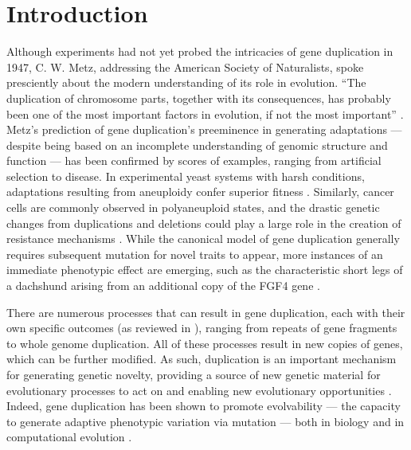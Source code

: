\section{Introduction} \label{sec:introduction}

Although experiments had not yet probed the intricacies of gene duplication in 1947, C. W. Metz, addressing the American Society of Naturalists, spoke presciently about the modern understanding of its role in evolution.
``The duplication of chromosome parts, together with its consequences, has probably been one of the most important factors in evolution, if not the most important'' \citep{Metz:chromosomeDuplication1947}.
Metz's prediction of gene duplication's preeminence in generating adaptations --- despite being based on an incomplete understanding of genomic structure and function --- has been confirmed by scores of examples, ranging from artificial selection to disease.
In experimental yeast systems with harsh conditions, adaptations resulting from aneuploidy confer superior fitness \citep{Pavelka:2010}.
Similarly, cancer cells are commonly observed in polyaneuploid states, and the drastic genetic changes from duplications and deletions could play a large role in the creation of resistance mechanisms \citep{polyaneuploidCancer}.
While the canonical model of gene duplication generally requires subsequent mutation for novel traits to appear, more instances of an immediate phenotypic effect are emerging, such as the characteristic short legs of a dachshund arising from an additional copy of the FGF4 gene \citep{ohno1970evolution,dachshundGeneCopyNum}.

There are numerous processes that can result in gene duplication, each with their own specific outcomes (as reviewed in \citep{Zhang:2003fw}), ranging from repeats of gene fragments to whole genome duplication.
All of these processes result in new copies of genes, which can be further modified.
As such, duplication is an important mechanism for generating genetic novelty, providing a source of new genetic material for evolutionary processes to act on and enabling new evolutionary opportunities \citep{Zhang:2003fw,Crow:2006role,Magadum:2013wu}.
Indeed, gene duplication has been shown to promote evolvability --- the capacity to generate adaptive phenotypic variation via mutation --- both in biology and in computational evolution \citep{Hu:2010ea}.

